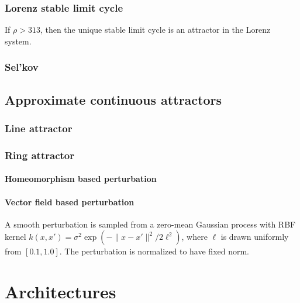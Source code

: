 \documentclass{article}
\theoremstyle{definition} \newtheorem{definition}{Definition}  \newtheorem{example}{Example}
\theoremstyle{remark} \newtheorem{remark}{Remark}
\newcounter{ct}
\begin{document}
\subsubsection{Lorenz stable limit cycle}
\citep{lorenz1963deterministic}
If $\rho>313$, then the unique stable limit cycle is an attractor in the Lorenz system\citep{gaiko2014global}.


\subsubsection{Sel'kov}
\citep{selkov1968self}




\subsection{Approximate continuous attractors}
\subsubsection{Line attractor}

\subsubsection{Ring attractor}
\paragraph{Homeomorphism based perturbation}


\paragraph{Vector field based perturbation}
 A smooth perturbation is sampled from a zero-mean Gaussian process with RBF kernel $k(x, x') = \sigma^2 \exp(-\|x - x'\|^2 / 2\ell^2)$, where $\ell$ is drawn uniformly from $[0.1, 1.0]$.
 The perturbation is normalized to have fixed norm.



\newpage
\section{Architectures}
\end{document}
